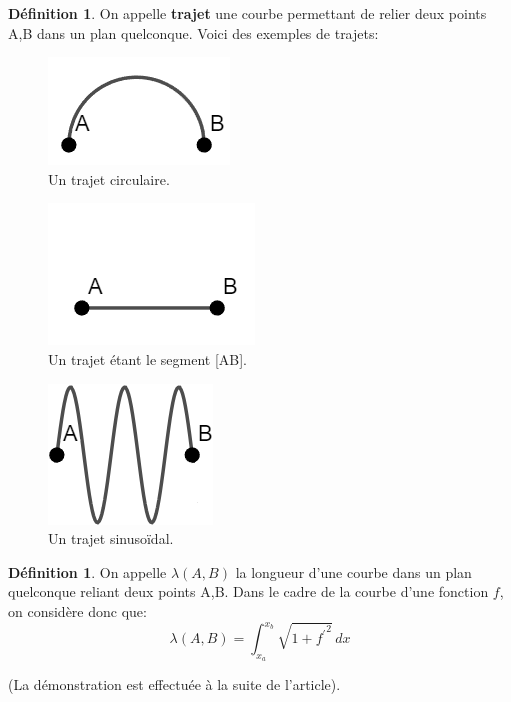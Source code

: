 \documentclass{amsart}
\theoremstyle{definition}
\newtheorem{definition}[theorem]{Définition}
\theoremstyle{remark}
\numberwithin{equation}{section}
\begin{document}
\begin{definition}
  On appelle \textbf{trajet} une courbe permettant de relier deux points A,B dans un plan quelconque. Voici des exemples de trajets:

  \begin{figure}[!h]
    \centering
    \includegraphics[scale=0.5]{circle.png}
    \caption{Un trajet circulaire.}
  \end{figure}

  \begin{figure}[!h]
    \centering
    \includegraphics[scale=0.5]{line.png}
    \caption{Un trajet étant le segment [AB].}
  \end{figure}

  \begin{figure}[!h]
    \centering
    \includegraphics[scale=0.5]{sinus.png}
    \caption{Un trajet sinusoïdal.}
  \end{figure}
\end{definition}

\begin{definition}
  On appelle $\lambda(A,B)$ la longueur d'une courbe dans un plan quelconque reliant deux points A,B. Dans le cadre de la courbe d'une fonction $f$,
  on considère donc que: \[\lambda(A,B)=\int_{x_a}^{x_b} \sqrt{1+{f^\prime}^2} \,dx\]
  
  (La démonstration est effectuée à la suite de l'article).
\end{definition}
\end{document}
